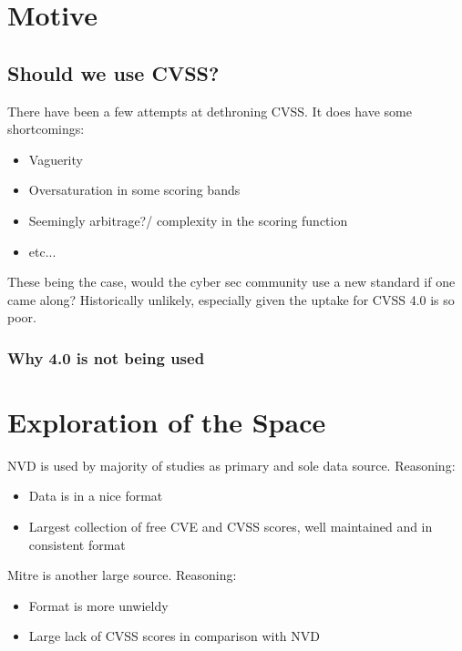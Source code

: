 \documentclass[11pt]{article}
\begin{document}
\section{Motive}
\subsection{Should we use CVSS?}

There have been a few attempts at dethroning CVSS. It does have some shortcomings:

\begin{itemize}
	\item Vaguerity
	\item Oversaturation in some scoring bands
	\item Seemingly arbitrage?/ complexity in the scoring function
	\item etc...
\end{itemize}

These being the case, would the cyber sec community use a new standard if one came along?
Historically unlikely, especially given the uptake for CVSS 4.0 is so poor.

\subsubsection{Why 4.0 is not being used}
\section{Exploration of the Space}

NVD is used by majority of studies as primary and sole data source.
Reasoning:
\begin{itemize}
	\item Data is in a nice format
	\item Largest collection of free CVE and CVSS scores, well maintained and in consistent format
\end{itemize}

Mitre is another large source.
Reasoning:
\begin{itemize}
	\item Format is more unwieldy
	\item Large lack of CVSS scores in comparison with NVD
\end{itemize}
\end{document}
